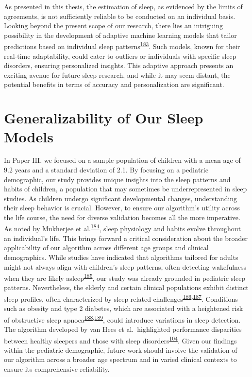 \documentclass[
  10pt,
]{scrbook}
\begin{document}
As presented in this thesis, the estimation of sleep, as evidenced by
the limits of agreements, is not sufficiently reliable to be conducted
on an individual basis. Looking beyond the present scope of our
research, there lies an intriguing possibility in the development of
adaptive machine learning models that tailor predictions based on
individual sleep
patterns\textsuperscript{\protect\hyperlink{ref-oyebode_2023}{183}}.
Such models, known for their real-time adaptability, could cater to
outliers or individuals with specific sleep disorders, ensuring
personalized insights. This adaptive approach presents an exciting
avenue for future sleep research, and while it may seem distant, the
potential benefits in terms of accuracy and personalization are
significant.

\hypertarget{generalizability-of-our-sleep-models}{%
\section{Generalizability of Our Sleep
Models}\label{generalizability-of-our-sleep-models}}

In Paper III, we focused on a sample population of children with a mean
age of 9.2 years and a standard deviation of 2.1. By focusing on a
pediatric demographic, our study provides unique insights into the sleep
patterns and habits of children, a population that may sometimes be
underrepresented in sleep studies. As children undergo significant
developmental changes, understanding their sleep behavior is crucial.
However, to ensure our algorithm's utility across the life course, the
need for diverse validation becomes all the more imperative. As noted by
Mukherjee et
al.\textsuperscript{\protect\hyperlink{ref-mukherjee_2015}{184}}, sleep
physiology and habits evolve throughout an individual's life. This
brings forward a critical consideration about the broader applicability
of our algorithm across different age groups and clinical demographics.
While studies have indicated that algorithms tailored for adults might
not always align with children's sleep patterns, often detecting
wakefulness when they are likely
asleep\textsuperscript{\protect\hyperlink{ref-quante_2018}{185}}, our
study was already grounded in pediatric sleep patterns. Nevertheless,
the elderly and certain clinical populations exhibit distinct sleep
profiles, often characterized by sleep-related
challenges\textsuperscript{\protect\hyperlink{ref-cassidy_2016}{186},\protect\hyperlink{ref-espiritu_2008}{187}}.
Conditions such as obesity and type 2 diabetes, which are associated
with a heightened risk of obstructive sleep
apnoea\textsuperscript{\protect\hyperlink{ref-altaf_2017}{188},\protect\hyperlink{ref-heinzer_2015}{189}},
could introduce variations in sleep detection. The algorithm developed
by van Hees et al.~highlighted performance disparities between healthy
sleepers and those with sleep
disorders\textsuperscript{\protect\hyperlink{ref-van_hees_estimating_2018}{104}}.
Given our findings within the pediatric demographic, future work should
involve the validation of our algorithm across a broader age spectrum
and in varied clinical contexts to ensure its comprehensive reliability.
\end{document}
